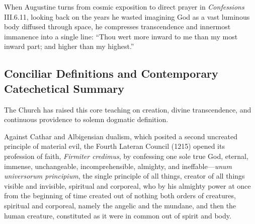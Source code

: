 When Augustine turns from cosmic exposition to direct prayer in \emph{Confessions} III.6.11, looking back on the years he wasted imagining God as a vast luminous body diffused through space, he compresses transcendence and innermost immanence into a single line: ``Thou wert more inward to me than my most inward part; and higher than my highest.''

\subsection{Conciliar Definitions and Contemporary Catechetical Summary}

The Church has raised this core teaching on creation, divine transcendence, and continuous providence to solemn dogmatic definition.

Against Cathar and Albigensian dualism, which posited a second uncreated principle of material evil, the Fourth Lateran Council (1215) opened its profession of faith, \emph{Firmiter credimus}, by confessing one sole true God, eternal, immense, unchangeable, incomprehensible, almighty, and ineffable---\emph{unum universorum principium}, the single principle of all things, creator of all things visible and invisible, spiritual and corporeal, who by his almighty power at once from the beginning of time created out of nothing both orders of creatures, spiritual and corporeal, namely the angelic and the mundane, and then the human creature, constituted as it were in common out of spirit and body.

